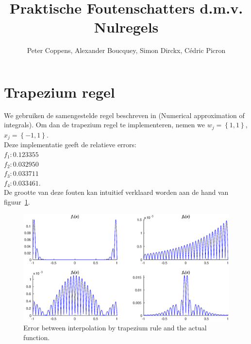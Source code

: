 \documentclass{article}
\title{Praktische Foutenschatters d.m.v. Nulregels}
\author{Peter Coppens, Alexander Boucquey, Simon Dirckx, Cédric Picron}
\date{}
\begin{document}

\maketitle

\section{Trapezium regel}
We gebruiken de samengestelde regel beschreven in (Numerical approximation of integrals). Om dan de trapezium regel te implementeren, nemen we $w_j = \left\{1, 1\right\}$, $x_j = \left\{-1, 1\right\}$. \\

Deze implementatie geeft de relatieve errors: \\
$f_1: 0.123355$ \\
$f_2: 0.032950$ \\
$f_3: 0.033711$ \\
$f_4: 0.033461$. \\

De grootte van deze fouten kan intuitief verklaard worden aan de hand van figuur~\ref{fig:ctrap}.

\begin{figure}[H]
\centering
\includegraphics[width=\linewidth, trim=2cm 0.5cm 2cm 0.5cm, clip]{ctrap.eps}
\caption{Error between interpolation by trapezium rule and the actual function.} \label{fig:ctrap}
\end{figure}
\end{document}
